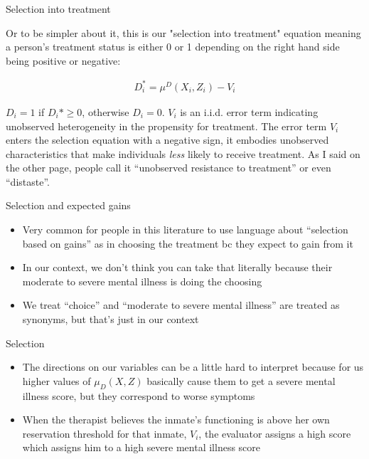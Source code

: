 \documentclass{beamer}
\begin{document}
\begin{frame}{Selection into treatment}

Or to be simpler about it, this is our "selection into treatment" equation meaning a person's treatment status is either 0 or 1 depending on the right hand side being positive or negative:

\begin{eqnarray*}
D_i^* = \mu^D(X_i,Z_i) - V_i
\end{eqnarray*}

\bigskip

$D_i=1$ if $D_i*\geq 0$,  otherwise $D_i=0$.  $V_i$ is an i.i.d. error term indicating unobserved heterogeneity in the propensity for treatment.  The error term $V_i$ enters the selection equation with a negative sign, it embodies unobserved characteristics that make individuals \emph{less} likely to receive treatment. As I said on the other page, people call it ``unobserved resistance to treatment'' or even ``distaste''.  

\end{frame}


\begin{frame}{Selection and expected gains}

\begin{itemize}
\item Very common for people in this literature to use language about ``selection based on gains'' as in choosing the treatment bc they expect to gain from it
\item In our context, we don't think you can take that literally because their moderate to severe mental illness is doing the choosing
\item We treat ``choice'' and ``moderate to severe mental illness'' are treated as synonyms, but that's just in our context
\end{itemize}

\end{frame}

\begin{frame}{Selection}

\begin{itemize}
\item The directions on our variables can be a little hard to interpret because for us higher values of $\mu_D(X,Z)$ basically cause them to get a severe mental illness score, but they correspond to worse symptoms
\item When the therapist believes the inmate's functioning is above her own reservation threshold for that inmate, $V_i$, the evaluator assigns a high score which assigns him to a high severe mental illness score
\end{itemize}

\end{frame}
\end{document}
